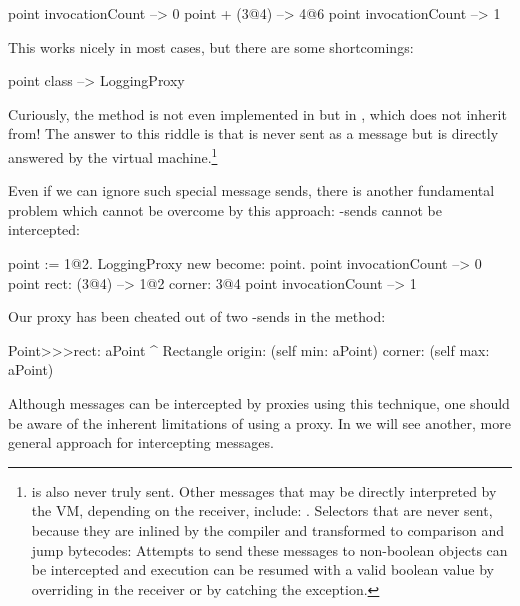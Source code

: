 \documentclass[a4paper,10pt,twoside]{book}
\begin{document}
\begin{code}{}
point invocationCount --> 0
point + (3@4)             --> 4@6
point invocationCount --> 1
\end{code}

This works nicely in most cases, but there are some shortcomings:
\begin{code}{}
point class --> LoggingProxy
\end{code}
Curiously, the method  is not even implemented in  but in , which  does not inherit from!
The answer to this riddle is that  is never sent as a message but is directly answered by the virtual machine.\footnote{ is also never truly sent.
Other messages that may be directly interpreted by the VM, depending on the receiver, include:
\ct{+- < > <= >= = ~= * / \ ==}
.
Selectors that are never sent, because they are inlined by the compiler and transformed to comparison and jump bytecodes:
Attempts to send these messages to non-boolean objects can be intercepted and execution can be resumed with a valid boolean value by overriding  in the receiver or by catching the  exception.
}%

Even if we can ignore such special message sends, there is another fundamental problem which cannot be overcome by this approach: \self-sends cannot be intercepted:
\begin{code}{}
point := 1@2.
LoggingProxy new become: point.
point invocationCount --> 0
point rect: (3@4)        --> 1@2 corner: 3@4
point invocationCount --> 1
\end{code}

Our proxy has been cheated out of two \self-sends in the  method:
\begin{code}{}
Point>>>rect: aPoint
        ^ Rectangle  origin: (self min: aPoint) corner: (self max: aPoint)
\end{code}

Although messages can be intercepted by proxies using this technique, one should be aware of the inherent limitations of using a proxy.  In  we will see another, more general approach for intercepting messages.
\end{document}

